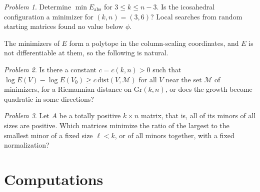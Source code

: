 \documentclass[11pt]{article}
\theoremstyle{remark}
\newtheorem{problem}{Problem}
\newcommand{\Gr}{\mathrm{Gr}}
\begin{document}
\begin{problem}
Determine $\min E_{\mathrm{abs}}$ for $3\le k\le n-3$. Is the icosahedral configuration a minimizer for $(k,n)=(3,6)$? Local searches from random starting matrices found no value below $\phi$.
\end{problem}

The minimizers of $E$ form a polytope in the column-scaling coordinates, and $E$ is not differentiable at them, so the following is natural.

\begin{problem}
Is there a constant $c=c(k,n)>0$ such that $\log E(V)-\log E(V_0)\ge c\,\mathrm{dist}(V,\mathcal{M})$ for all $V$ near the set $\mathcal{M}$ of minimizers, for a Riemannian distance on $\Gr(k,n)$, or does the growth become quadratic in some directions?
\end{problem}

\begin{problem}
Let $A$ be a totally positive $k\times n$ matrix, that is, all of its minors of all sizes are positive. Which matrices minimize the ratio of the largest to the smallest minor of a fixed size $\ell<k$, or of all minors together, with a fixed normalization?
\end{problem}

\section{Computations}\label{sec:comp}
\end{document}
